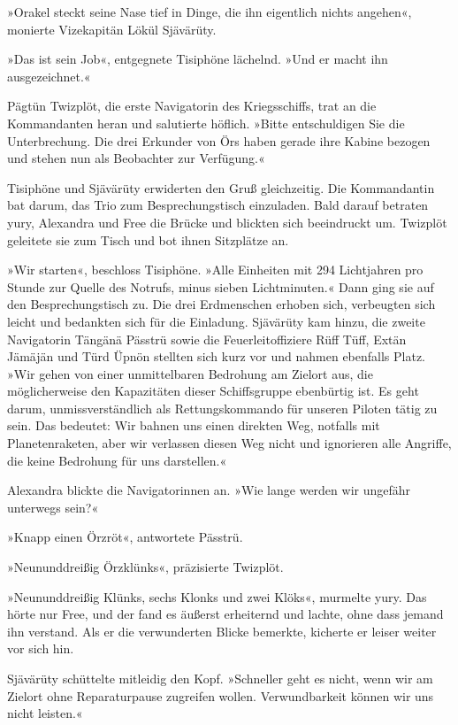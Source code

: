 »Orakel steckt seine Nase tief in Dinge, die ihn eigentlich nichts angehen«, monierte Vizekapitän Lökül Sjävärüty.

»Das ist sein Job«, entgegnete Tisiphöne lächelnd. »Und er macht ihn ausgezeichnet.«

Pägtün Twizplöt, die erste Navigatorin des Kriegsschiffs, trat an die Kommandanten heran und salutierte höflich. »Bitte entschuldigen Sie die Unterbrechung. Die drei Erkunder von Örs haben gerade ihre Kabine bezogen und stehen nun als Beobachter zur Verfügung.«

Tisiphöne und Sjävärüty erwiderten den Gruß gleichzeitig. Die Kommandantin bat darum, das Trio zum Besprechungstisch einzuladen. Bald darauf betraten yury, Alexandra und Free die Brücke und blickten sich beeindruckt um. Twizplöt geleitete sie zum Tisch und bot ihnen Sitzplätze an.

»Wir starten«, beschloss Tisiphöne. »Alle Einheiten mit 294 Lichtjahren pro Stunde zur Quelle des Notrufs, minus sieben Lichtminuten.« Dann ging sie auf den Besprechungstisch zu. Die drei Erdmenschen erhoben sich, verbeugten sich leicht und bedankten sich für die Einladung. Sjävärüty kam hinzu, die zweite Navigatorin Tängänä Pässtrü sowie die Feuerleitoffiziere Rüff Tüff, Extän Jämäjän und Türd Üpnön stellten sich kurz vor und nahmen ebenfalls Platz. »Wir gehen von einer unmittelbaren Bedrohung am Zielort aus, die möglicherweise den Kapazitäten dieser Schiffsgruppe ebenbürtig ist. Es geht darum, unmissverständlich als Rettungskommando für unseren Piloten tätig zu sein. Das bedeutet: Wir bahnen uns einen direkten Weg, notfalls mit Planetenraketen, aber wir verlassen diesen Weg nicht und ignorieren alle Angriffe, die keine Bedrohung für uns darstellen.«

Alexandra blickte die Navigatorinnen an. »Wie lange werden wir ungefähr unterwegs sein?«

»Knapp einen Örzröt«, antwortete Pässtrü.

»Neununddreißig Örzklünks«, präzisierte Twizplöt.

»Neununddreißig Klünks, sechs Klonks und zwei Klöks«, murmelte yury. Das hörte nur Free, und der fand es äußerst erheiternd und lachte, ohne dass jemand ihn verstand. Als er die verwunderten Blicke bemerkte, kicherte er leiser weiter vor sich hin.

Sjävärüty schüttelte mitleidig den Kopf. »Schneller geht es nicht, wenn wir am Zielort ohne Reparaturpause zugreifen wollen. Verwundbarkeit können wir uns nicht leisten.«

